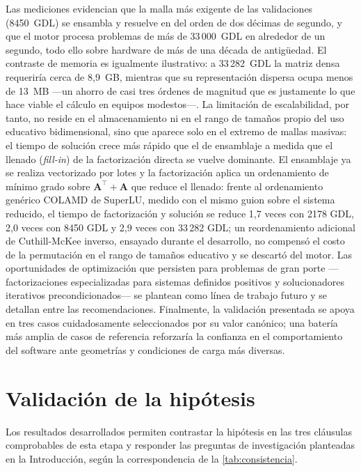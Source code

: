 Las mediciones evidencian que la malla más exigente de las validaciones (8450~GDL) se ensambla y resuelve en del orden de dos décimas de segundo, y que el motor procesa problemas de más de 33\,000~GDL en alrededor de un segundo, todo ello sobre hardware de más de una década de antigüedad. El contraste de memoria es igualmente ilustrativo: a 33\,282~GDL la matriz densa requeriría cerca de 8{,}9~GB, mientras que su representación dispersa ocupa menos de 13~MB ---un ahorro de casi tres órdenes de magnitud que es justamente lo que hace viable el cálculo en equipos modestos---. La limitación de escalabilidad, por tanto, no reside en el almacenamiento ni en el rango de tamaños propio del uso educativo bidimensional, sino que aparece solo en el extremo de mallas masivas: el tiempo de solución crece más rápido que el de ensamblaje a medida que el llenado (\emph{fill-in}) de la factorización directa se vuelve dominante. El ensamblaje ya se realiza vectorizado por lotes y la factorización aplica un ordenamiento de mínimo grado sobre $\bm{A}^{\top}+\bm{A}$ que reduce el llenado: frente al ordenamiento genérico COLAMD de SuperLU, medido con el mismo guion sobre el sistema reducido, el tiempo de factorización y solución se reduce 1,7 veces con 2178 GDL, 2,0 veces con 8450 GDL y 2,9 veces con 33\,282 GDL; un reordenamiento adicional de Cuthill-McKee inverso, ensayado durante el desarrollo, no compensó el costo de la permutación en el rango de tamaños educativo y se descartó del motor. Las oportunidades de optimización que persisten para problemas de gran porte —factorizaciones especializadas para sistemas definidos positivos y solucionadores iterativos precondicionados— se plantean como línea de trabajo futuro y se detallan entre las recomendaciones. Finalmente, la validación presentada se apoya en tres casos cuidadosamente seleccionados por su valor canónico; una batería más amplia de casos de referencia reforzaría la confianza en el comportamiento del software ante geometrías y condiciones de carga más diversas.

\section{Validación de la hipótesis}
\label{sec:validacion-hipotesis}

Los resultados desarrollados permiten contrastar la hipótesis en las tres cláusulas comprobables de esta etapa y responder las preguntas de investigación planteadas en la Introducción, según la correspondencia de la \autoref{tab:consistencia}.

